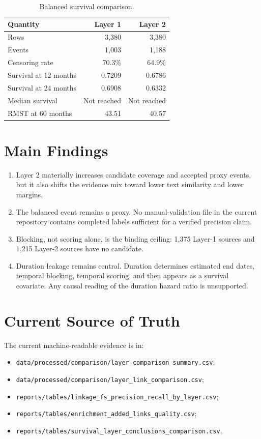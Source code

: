 \documentclass[11pt]{article}
\begin{document}
\begin{table}[h!]
\centering
\caption{Balanced survival comparison.}
\begin{tabular}{lrr}
\toprule
Quantity & Layer 1 & Layer 2 \\
\midrule
Rows & 3{,}380 & 3{,}380 \\
Events & 1{,}003 & 1{,}188 \\
Censoring rate & 70.3\% & 64.9\% \\
Survival at 12 months & 0.7209 & 0.6786 \\
Survival at 24 months & 0.6908 & 0.6332 \\
Median survival & Not reached & Not reached \\
RMST at 60 months & 43.51 & 40.57 \\
\bottomrule
\end{tabular}
\end{table}

\section{Main Findings}

\begin{enumerate}
    \item Layer 2 materially increases candidate coverage and accepted proxy
    events, but it also shifts the evidence mix toward lower text similarity and
    lower margins.
    \item The balanced event remains a proxy. No manual-validation file in the
    current repository contains completed labels sufficient for a verified
    precision claim.
    \item Blocking, not scoring alone, is the binding ceiling: 1{,}375 Layer-1
    sources and 1{,}215 Layer-2 sources have no candidate.
    \item Duration leakage remains central. Duration determines estimated end
    dates, temporal blocking, temporal scoring, and then appears as a survival
    covariate. Any causal reading of the duration hazard ratio is unsupported.
\end{enumerate}

\section{Current Source of Truth}

The current machine-readable evidence is in:
\begin{itemize}
    \item \texttt{data/processed/comparison/layer\_comparison\_summary.csv};
    \item \texttt{data/processed/comparison/layer\_link\_comparison.csv};
    \item \texttt{reports/tables/linkage\_fs\_precision\_recall\_by\_layer.csv};
    \item \texttt{reports/tables/enrichment\_added\_links\_quality.csv};
    \item \texttt{reports/tables/survival\_layer\_conclusions\_comparison.csv}.
\end{itemize}
\end{document}
